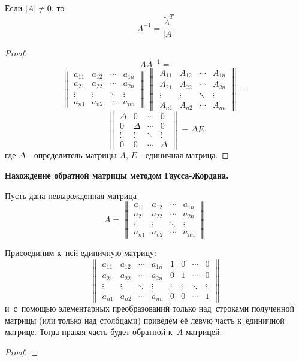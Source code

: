Если $|A| \neq 0$, то
\begin{equation*}
A^{-1} = \frac{\tilde A^T}{|A|}
\end{equation*}
\begin{proof}
	$$
	AA^{-1} = 
	$$
	$$
	\begin{Vmatrix}
	a_{11} & a_{12} & \cdots & a_{1n} \\
	a_{21} & a_{22} & \cdots & a_{2n} \\
	\vdots & \vdots & \ddots & \vdots \\
	a_{n1} & a_{n2} & \cdots & a_{nn}
	\end{Vmatrix}
	\begin{Vmatrix}
	A_{11} & A_{12} & \cdots & A_{1n} \\
	A_{21} & A_{22} & \cdots & A_{2n} \\
	\vdots & \vdots & \ddots & \vdots \\
	A_{n1} & A_{n2} & \cdots & A_{nn}
	\end{Vmatrix} = 
	$$
	$$
	\begin{Vmatrix}
	\Delta & 0 & \cdots & 0 \\
	0 & \Delta & \cdots & 0 \\
	\vdots & \vdots & \ddots & \vdots \\
	0 & 0 & \cdots & \Delta
	\end{Vmatrix} = \Delta E
	$$
	где $\Delta$ - определитель матрицы $A$, $E$ - единичная матрица.
\end{proof}


\textbf{Нахождение обратной матрицы методом Гаусса-Жордана.}

Пусть дана невырожденная матрица
\begin{equation*}
A =
\begin{Vmatrix}
a_{11} & a_{12} & \cdots & a_{1n} \\
a_{21} & a_{22} & \cdots & a_{2n} \\
\vdots & \vdots & \ddots & \vdots \\
a_{n1} & a_{n2} & \cdots & a_{nn}
\end{Vmatrix}
\end{equation*}

Присоединим к~ней единичную матрицу:
\begin{equation*}
\begin{Vmatrix}
a_{11} & a_{12} & \cdots & a_{1n} & 1 & 0 & \cdots & 0 \\
a_{21} & a_{22} & \cdots & a_{2n} & 0 & 1 & \cdots & 0 \\
\vdots & \vdots & \ddots & \vdots & \vdots & \vdots & \ddots & \vdots \\
a_{n1} & a_{n2} & \cdots & a_{nn} & 0 & 0 & \cdots & 1
\end{Vmatrix}
\end{equation*}
и~с~помощью элементарных преобразований только над~строками полученной матрицы (или только над столбцами) приведём её левую часть к~единичной матрице.
Тогда правая часть будет обратной к~$A$ матрицей.
\begin{proof}
	
\end{proof}